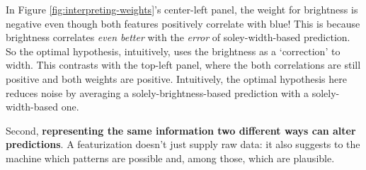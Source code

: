   In Figure \ref{fig:interpreting-weights}'s center-left panel, the weight for brightness is negative
  even though both features positively correlate with {\blu blue}!  This is
  because brightness correlates \emph{even better} with the
  \emph{error} of soley-width-based prediction.  So the
  optimal hypothesis, intuitively, uses the brightness as a `correction'
  to width.
  This contrasts with the top-left panel, where the both correlations are still
  positive and both weights are positive.  Intuitively,
  the optimal hypothesis here reduces noise by averaging a solely-brightness-based
  prediction with a solely-width-based one.

  \begin{marginfigure}[-.6cm]
    \centering
    \caption{%
      \textbf{Relations between feature statistics and optimal weights.}
      Each panel shows a different 2D binary classification task
      and a maximum-margin hypothesis.  We shade margin-achieving points.
      To save ink we refer to the vertical and horizontal features
      as \textbf{brightness} and \textbf{width};
      but you should be more imaginative.
      \textbf{Left:} \emph{positive weights are consistent with positive, negative,
      or zero correlation!}
      \textbf{Right:}  \emph{presenting the same information in different
      coordinates (here, all 2D) alters predictions!}
    }
    \label{fig:interpreting-weights}
  \end{marginfigure}


  Second, \textbf{representing the same information two different ways can alter
  predictions}.  A featurization doesn't just supply raw data: it
  also suggests to the machine which patterns are possible and, among those,
  which are plausible.

